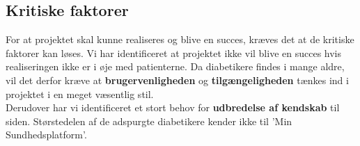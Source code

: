 \subsection{Kritiske faktorer}
For at projektet skal kunne realiseres og blive en succes, kræves det at de kritiske faktorer kan løses. Vi har identificeret at projektet ikke vil blive en succes hvis realiseringen ikke er i øje med patienterne. Da diabetikere findes i mange aldre, vil det derfor kræve at \textbf{brugervenligheden} og \textbf{tilgængeligheden} tænkes ind i projektet i en meget væsentlig stil.\\
Derudover har vi identificeret et stort behov for \textbf{udbredelse af kendskab} til siden. Størstedelen af de adspurgte diabetikere kender ikke til 'Min Sundhedsplatform'.